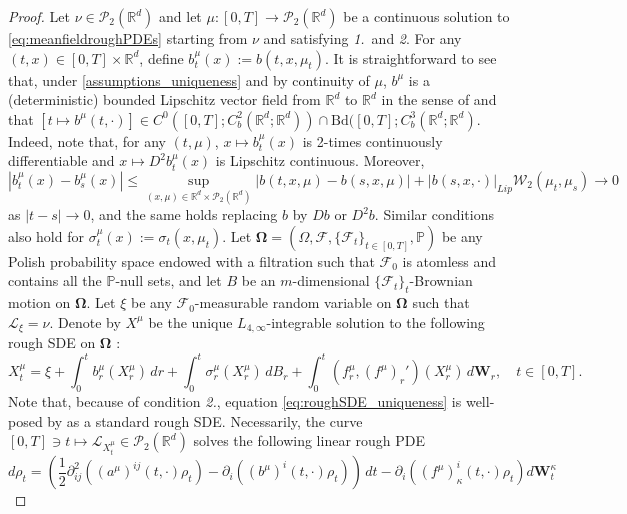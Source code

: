 \documentclass[10pt, a4paper]{article} %
\newcommand{\R}{\mathbb{R}}
\theoremstyle{definition}
\theoremstyle{plain}
\begin{document}
\begin{proof}
    Let $\nu \in \mathcal{P}_2(\R^d)$ and let $\mu:[0,T] \to \mathcal{P}_2(\R^d)$ be a continuous solution to \eqref{eq:meanfieldroughPDEs} starting from $\nu$ and satisfying \textit{1.}\ and \textit{2}. 
    For any $(t,x) \in [0,T] \times \R^d$, define $b^\mu_t(x) := b(t, x,\mu_t)$. It is straightforward to see that, under \cref{assumptions_uniqueness} and by continuity of $\mu$, $b^\mu$ is a (deterministic) bounded Lipschitz vector field from $\R^d$ to $\R^d$ in the sense of \cite[Definition 4.1]{FHL21} and that $[t \mapsto b^\mu(t,\cdot)] \in C^0([0,T]; C^2_b(\R^d;\R^d)) \cap \mathrm{Bd}([0,T];C^3_b(\R^d;\R^d)$. 
    Indeed, note that, for any $(t,\mu)$, $x \mapsto b^\mu_t(x)$ is 2-times continuously differentiable and $x \mapsto D^2 b^\mu_t(x)$ is Lipschitz continuous. Moreover, \begin{equation*}
        |b^\mu_t(x) - b^\mu_s(x)| \le \sup_{(x,\mu) \in \R^d \times \mathcal{P}_2(\R^d)} |b(t,x,\mu) - b(s,x,\mu)| + |b(s,x,\cdot)|_{Lip} \mathcal{W}_2(\mu_t, \mu_s) \to 0
    \end{equation*}
    as $|t-s| \to 0$, and the same holds replacing $b$ by $Db$ or $D^2b$. 
    Similar conditions also hold for $\sigma^\mu_t(x) := \sigma_t(x,\mu_t)$.
    Let $\mathbf{\Omega}=(\Omega,\mathcal{F},\{\mathcal{F}_t\}_{t \in [0,T]},\mathbb{P})$ be any Polish probability space endowed with a filtration such that $\mathcal{F}_0$ {is atomless and} contains all the $\mathbb{P}$-null sets, and let $B$ be an $m$-dimensional $\{\mathcal{F}_t\}_t$-Brownian motion on $\mathbf{\Omega}$. 
    Let $\xi$ be any $\mathcal{F}_0$-measurable random variable on $\mathbf{\Omega}$ such that $\mathcal{L}_\xi = \nu$.
    Denote by $X^\mu$ be the unique $L_{4,\infty}$-integrable solution to the following rough SDE on $\mathbf{\Omega}$ : \begin{equation} \label{eq:roughSDE_uniqueness}
        X^\mu_t = \xi + \int_0^t b_r^\mu(X_r^\mu) \, dr + \int_0^t \sigma^\mu_r(X_r^\mu) \, dB_r + \int_0^t (f^\mu_r, (f^\mu)_r')(X_r^\mu) \, d\mathbf{W}_r , \quad t \in [0,T] .
    \end{equation}
    Note that, because of condition \textit{2.}, equation  \eqref{eq:roughSDE_uniqueness} is well-posed by \cite[Theorem 4.7]{FHL21} as a standard rough SDE. 
    Necessarily, the curve $[0,T] \ni t \mapsto \mathcal{L}_{X^\mu_t} \in \mathcal{P}_2(\R^d)$ solves the following linear rough PDE \begin{equation*}
        d\rho_t = \left( \frac{1}{2} \partial^2_{ij} ((a^\mu)^{ij}(t,\cdot) \rho_t) - \partial_i ((b^\mu)^i(t,\cdot)\rho_t) \right) \, dt - \partial_i ((f^\mu)^i_\kappa(t,\cdot)\rho_t) d\mathbf{W}_t^\kappa

\end{equation*}
\end{proof}
\end{document}
